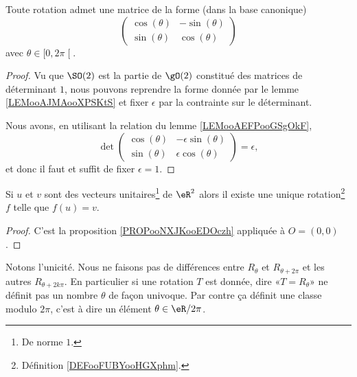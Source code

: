 \begin{lemma}       \label{LEMooHRESooQTrpMz}
    Toute rotation admet une matrice de la forme (dans la base canonique)
    \begin{equation}
        \begin{pmatrix}
            \cos(\theta)    &   -\sin(\theta)    \\ 
            \sin(\theta)    &   \cos(\theta)    
        \end{pmatrix}
    \end{equation}
    avec \( \theta\in\mathopen[ 0 , 2\pi \mathclose[\).
\end{lemma}

\begin{proof}
    Vu que \( \SO(2)\) est la partie de \( \gO(2)\) constitué des matrices de déterminant \( 1\), nous pouvons reprendre la forme donnée par le lemme \ref{LEMooAJMAooXPSKtS} et fixer \( \epsilon\) par la contrainte sur le déterminant.

    Nous avons, en utilisant la relation du lemme \ref{LEMooAEFPooGSgOkF},
    \begin{equation}
        \det\begin{pmatrix}
            \cos(\theta)    &   -\epsilon\sin(\theta)    \\ 
            \sin(\theta)    &   \epsilon\cos(\theta)    
        \end{pmatrix}=\epsilon,
    \end{equation}
    et donc il faut et suffit de fixer \( \epsilon=1\).
\end{proof}

\begin{proposition}      \label{PROPooDWIMooQPkobw}
    Si \( u\) et \( v\) sont des vecteurs unitaires\footnote{De norme \( 1\).} de \( \eR^2\) alors il existe une unique rotation\footnote{Définition \ref{DEFooFUBYooHGXphm}.} \( f\) telle que \( f(u)=v\).
\end{proposition}

\begin{proof}
    C'est la proposition \ref{PROPooNXJKooEDOczh} appliquée à \( O=(0,0)\).
\end{proof}

Notons l'unicité. Nous ne faisons pas de différences entre \( R_{\theta}\) et \( R_{\theta+2\pi}\) et les autres \( R_{\theta+2k\pi}\). En particulier si une rotation \( T\) est donnée, dire «\( T=R_{\theta}\)» ne définit pas un nombre \( \theta\) de façon univoque. Par contre ça définit une classe modulo \( 2\pi\), c'est à dire un élément \( \theta\in \eR/2\pi\).

